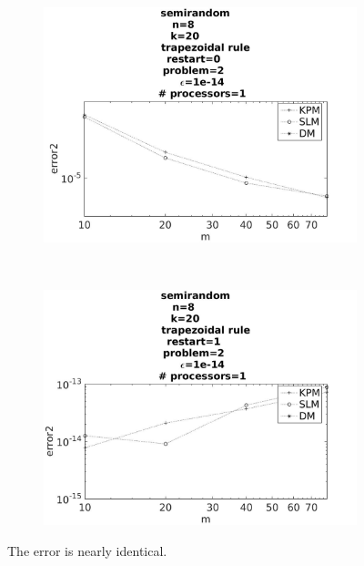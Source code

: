 \begin{figure}[H]
        \centering
        \begin{subfigure}[b]{0.45\textwidth}
                \includegraphics[width=\textwidth]{../MATLAB/fig/vsresulterrorr.jpg}
                \caption{  }
                \label{fig:vsresulterror1}
        \end{subfigure}
        ~
        \begin{subfigure}[b]{0.45\textwidth}
                \includegraphics[width=\textwidth]{../MATLAB/fig/vsresulterror.jpg}
                \caption{  }
                \label{fig:vsresulterror2}
        \end{subfigure}
        \caption{ The error is nearly identical.  }
        \label{fig:vsresulterror}
\end{figure}


